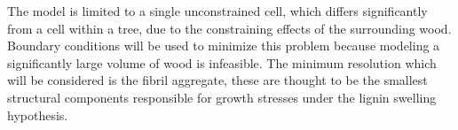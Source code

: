 The model is limited to a single unconstrained cell, which differs significantly
from a cell within a tree, due to the constraining effects of the surrounding
wood. Boundary conditions will be used to minimize this problem because modeling
a significantly large volume of wood is infeasible. The minimum resolution which
will be considered is the fibril aggregate, these are thought to be the smallest
structural components responsible for growth stresses under the lignin swelling
hypothesis.